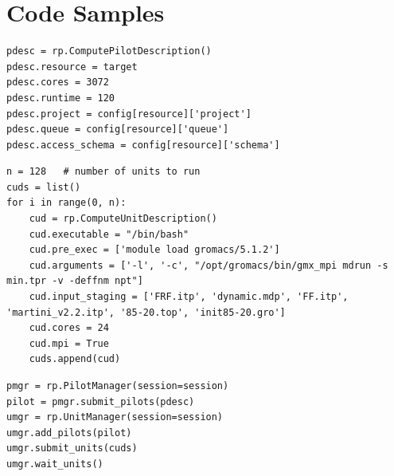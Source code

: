 \documentclass[preprint,12pt, a4paper]{elsarticle}
\begin{document}
\section*{Code Samples}\label{sec:metadata}

\begin{lstlisting}
pdesc = rp.ComputePilotDescription()        
pdesc.resource = target
pdesc.cores = 3072
pdesc.runtime = 120
pdesc.project = config[resource]['project']
pdesc.queue = config[resource]['queue']
pdesc.access_schema = config[resource]['schema']
\end{lstlisting}

\begin{lstlisting}
n = 128   # number of units to run
cuds = list()
for i in range(0, n):
    cud = rp.ComputeUnitDescription()
    cud.executable = "/bin/bash"
    cud.pre_exec = ['module load gromacs/5.1.2']
    cud.arguments = ['-l', '-c', "/opt/gromacs/bin/gmx_mpi mdrun -s min.tpr -v -deffnm npt"]
    cud.input_staging = ['FRF.itp', 'dynamic.mdp', 'FF.itp', 'martini_v2.2.itp', '85-20.top', 'init85-20.gro'] 
    cud.cores = 24
    cud.mpi = True    
    cuds.append(cud)
\end{lstlisting}

\begin{lstlisting}
pmgr = rp.PilotManager(session=session)
pilot = pmgr.submit_pilots(pdesc)
umgr = rp.UnitManager(session=session)
umgr.add_pilots(pilot)
umgr.submit_units(cuds)
umgr.wait_units()
\end{lstlisting}
\end{document}

